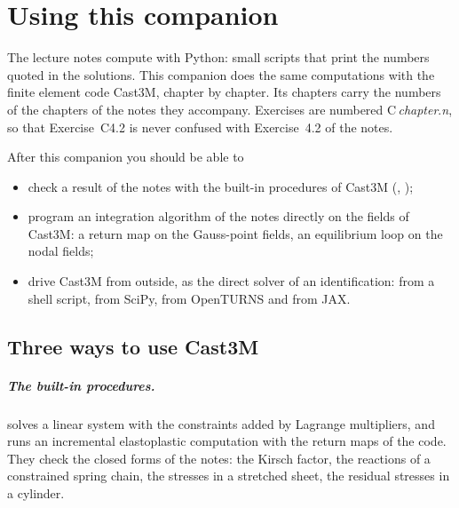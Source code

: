 \chapter*{Using this companion}\label{cc:intro}


The lecture notes compute with Python: small scripts that print the numbers
quoted in the solutions. This companion does the same computations with the
finite element code Cast3M, chapter by chapter. Its chapters carry the numbers
of the chapters of the notes they accompany. Exercises are numbered
C\,\textit{chapter}.\textit{n}, so that Exercise~C4.2 is never confused with
Exercise~4.2 of the notes.

After this companion you should be able to
\begin{itemize}
\item check a result of the notes with the built-in procedures of Cast3M
  (, );
\item program an integration algorithm of the notes directly on the fields of
  Cast3M: a return map on the Gauss-point fields, an equilibrium loop on the
  nodal fields;
\item drive Cast3M from outside, as the direct solver of an identification:
  from a shell script, from SciPy, from OpenTURNS and from JAX.
\end{itemize}

\section{Three ways to use Cast3M}\label{cc:sec-ways}
%

\paragraph{The built-in procedures.}
 solves a linear system with the constraints added by Lagrange
multipliers, and  runs an incremental elastoplastic computation
with the return maps of the code. They check the closed forms of the notes:
the Kirsch factor, the reactions of a constrained spring chain, the stresses
in a stretched sheet, the residual stresses in a cylinder.

